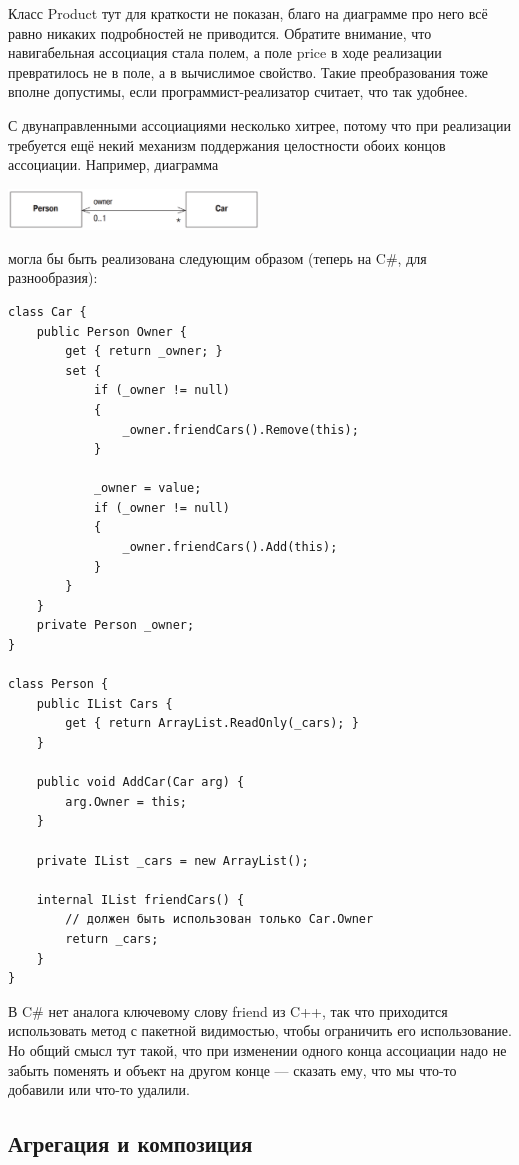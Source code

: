 \documentclass[a5paper]{article}
\begin{document}
Класс Product тут для краткости не показан, благо на диаграмме про него всё равно никаких подробностей не приводится. Обратите внимание, что навигабельная ассоциация стала полем, а поле price в ходе реализации превратилось не в поле, а в вычислимое свойство. Такие преобразования тоже вполне допустимы, если программист-реализатор считает, что так удобнее.

С двунаправленными ассоциациями несколько хитрее, потому что при реализации требуется ещё некий механизм поддержания целостности обоих концов ассоциации. Например, диаграмма

\begin{center}
	\includegraphics[width=0.5\textwidth]{twoWayAssociations.png}
\end{center}

могла бы быть реализована следующим образом (теперь на C\#, для разнообразия):

\begin{verbatim}
class Car {
    public Person Owner {
        get { return _owner; }
        set {
            if (_owner != null) 
            {
                _owner.friendCars().Remove(this);
            }

            _owner = value;
            if (_owner != null) 
            {
                _owner.friendCars().Add(this);
            }
        }
    }
    private Person _owner;
}

class Person {
    public IList Cars {
        get { return ArrayList.ReadOnly(_cars); }
    }

    public void AddCar(Car arg) {
        arg.Owner = this;
    }

    private IList _cars = new ArrayList();

    internal IList friendCars() {
        // должен быть использован только Car.Owner
        return _cars;
    }
}
\end{verbatim}

В C\# нет аналога ключевому слову friend из C++, так что приходится использовать метод с пакетной видимостью, чтобы ограничить его использование. Но общий смысл тут такой, что при изменении одного конца ассоциации надо не забыть поменять и объект на другом конце --- сказать ему, что мы что-то добавили или что-то удалили.

\subsection{Агрегация и композиция}
\end{document}
